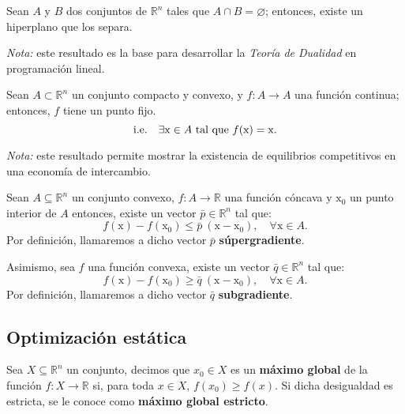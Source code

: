 \documentclass[8pt,a4paper]{extarticle}
\begin{document}
\begin{multicols}{3}
	\begin{boxtheo}[Minkowski]
		Sean $A$ y $B$ dos conjuntos de $\mathbb{R}^n$ tales que $A \cap B = \varnothing$; entonces, existe un hiperplano que los separa.
	\end{boxtheo}

	\emph{Nota:} este resultado es la base para desarrollar la \emph{Teoría de Dualidad} en programación lineal.

	\begin{boxtheo}
		Sean $A \subset \mathbb{R}^n$ un conjunto compacto y convexo, y $f : A \to A$ una función continua; entonces, $f$ tiene un punto fijo.
		\[
			\text{\normalfont i.e.} \quad \exists \mathrm{x} \in A \text{ tal que } f(\mathrm{x}) = \mathrm{x}.
		\]
	\end{boxtheo}
	
	\emph{Nota:} este resultado permite mostrar la existencia de equilibrios competitivos en una economía de intercambio.

	\newpage

	\begin{boxtheo}
		Sean $A \subseteq \mathbb{R}^n$ un conjunto convexo, $f : A \to \mathbb{R}$ una función cóncava y $\mathrm{x}_0$ un punto interior de $A$ entonces, existe un vector $\bar{p} \in \mathbb{R}^n$ tal que:
		\[f(\mathrm{x}) - f(\mathrm{x}_0) \leq \bar{p}\ (\mathrm{x} - \mathrm{x}_0), \quad \forall \mathrm{x} \in A.\]
		Por definición, llamaremos a dicho vector $\bar{p}$ \textbf{súpergradiente}. \par
		Asimismo, sea $f$ una función convexa, existe un vector $\bar{q} \in \mathbb{R}^n$ tal que:
		\[f(\mathrm{x}) - f(\mathrm{x}_0) \geq \bar{q}\ (\mathrm{x} - \mathrm{x}_0), \quad \forall \mathrm{x} \in A.\]
		Por definición, llamaremos a dicho vector $\bar{q}$ \textbf{subgradiente}.
	\end{boxtheo}
	
	\sectionbreak

	\subsection{Optimización estática}

	\begin{boxdef}
		Sea $X \subseteq \mathbb{R}^{n}$ un conjunto, decimos que $x_0 \in X$ es un \textbf{máximo global} de la función $f : X \to \mathbb{R}$ si, para toda $x \in X$, $f(x_0) \geq f(x)$. Si dicha desigualdad es estricta, se le conoce como \textbf{máximo global estricto}.
	\end{boxdef}


\end{multicols}
\end{document}
